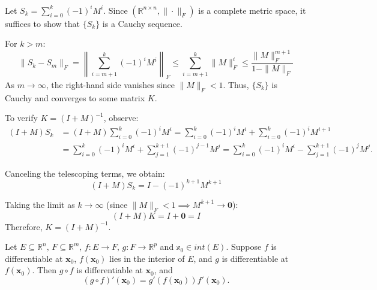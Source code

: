 \begin{pfbox}
Let $S_k = \sum_{i=0}^{k} (-1)^i M^i$. Since $(\mathbb{R}^{n \times n}, \|\cdot\|_F)$ is a complete metric space, it suffices to show that $\{S_k\}$ is a Cauchy sequence. 

For $k > m$:
\[ \|S_k - S_m\|_F = \left\| \sum_{i=m+1}^{k} (-1)^i M^i \right\|_F \le \sum_{i=m+1}^{k} \|M\|_F^i \le \frac{\|M\|_F^{m+1}}{1 - \|M\|_F} \]
As $m \to \infty$, the right-hand side vanishes since $\|M\|_F < 1$. Thus, $\{S_k\}$ is Cauchy and converges to some matrix $K$.

To verify $K = (I+M)^{-1}$, observe:
\begin{align*}
(I+M) S_k &= (I+M) \sum_{i=0}^{k} (-1)^i M^i = \sum_{i=0}^{k} (-1)^i M^i + \sum_{i=0}^{k} (-1)^i M^{i+1}\\
&=\sum_{i=0}^{k} (-1)^i M^i + \sum_{j=1}^{k+1} (-1)^{j-1} M^{j} = \sum_{i=0}^{k} (-1)^i M^i - \sum_{j=1}^{k+1} (-1)^j M^{j}.
\end{align*} 

Canceling the telescoping terms, we obtain:
\[ (I+M) S_k = I - (-1)^{k+1} M^{k+1} \]

Taking the limit as $k \to \infty$ (since $\|M\|_F < 1 \implies M^{k+1} \to \mathbf{0}$):
\[ (I+M) K = I + \mathbf{0} = I \]
Therefore, $K = (I+M)^{-1}$.
\end{pfbox}




\begin{theorem}
Let $E \subseteq \mathbb{R}^n,\, F\subseteq\mathbb{R}^m,\, f: E \to F,\, g: F\to\mathbb{R}^p$ and $\mathbb{x}_0\in int(E).$ 
Suppose $f$ is differentiable at $\mathbf{x}_0$, $f(\mathbf{x}_0)$ lies in the interior of $E$, and $g$ is differentiable at $f(\mathbf{x}_0)$.
Then $g \circ f$ is differentiable at $\mathbf{x}_0$, and
$$(g \circ f)'(\mathbf{x}_0) = g'(f(\mathbf{x}_0)) f'(\mathbf{x}_0).$$
\end{theorem}

